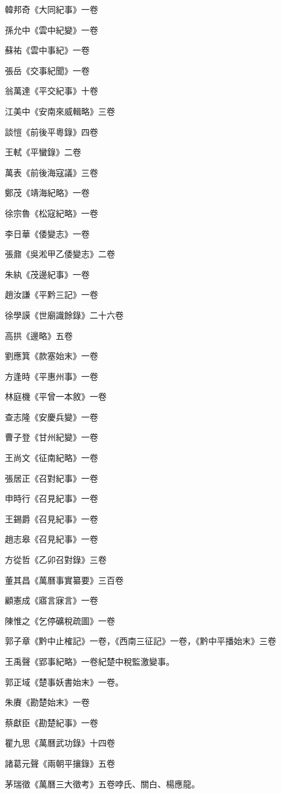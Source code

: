 韓邦奇《大同紀事》一卷

孫允中《雲中紀變》一卷

蘇祐《雲中事紀》一卷

張岳《交事紀聞》一卷

翁萬達《平交紀事》十卷

江美中《安南來威輯略》三卷

談愷《前後平粵錄》四卷

王軾《平蠻錄》二卷

萬表《前後海寇議》三卷

鄭茂《靖海紀略》一卷

徐宗魯《松寇紀略》一卷

李日華《倭變志》一卷

張鼐《吳淞甲乙倭變志》二卷

朱紈《茂邊紀事》一卷

趙汝謙《平黔三記》一卷

徐學謨《世廟識餘錄》二十六卷

高拱《邊略》五卷

劉應箕《款塞始末》一卷

方逢時《平惠州事》一卷

林庭機《平曾一本敘》一卷

查志隆《安慶兵變》一卷

曹子登《甘州紀變》一卷

王尚文《征南紀略》一卷

張居正《召對紀事》一卷

申時行《召見紀事》一卷

王錫爵《召見紀事》一卷

趙志皋《召見紀事》一卷

方從哲《乙卯召對錄》三卷

董其昌《萬曆事實纂要》三百卷

顧憲成《寤言寐言》一卷

陳惟之《乞停礦稅疏圖》一卷

郭子章《黔中止榷記》一卷，《西南三征記》一卷，《黔中平播始末》三卷

王禹聲《郢事紀略》一卷紀楚中稅監激變事。

郭正域《楚事妖書始末》一卷。

朱賡《勘楚始末》一卷

蔡獻臣《勘楚紀事》一卷

瞿九思《萬曆武功錄》十四卷

諸葛元聲《兩朝平攘錄》五卷

茅瑞徵《萬曆三大徵考》五卷哱氏、關白、楊應龍。

